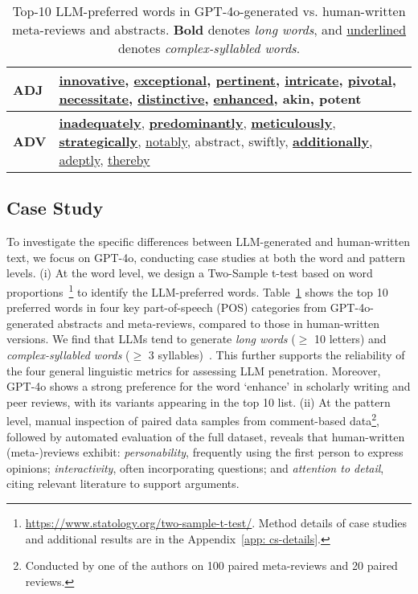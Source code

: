 \begin{table}[t]
{\begin{tabular}{@{}l|p{8cm}}
    \textbf{\small ADJ}  & \small \underline{\textbf{innovative}}, \underline{\textbf{exceptional}}, \underline{pertinent}, \underline{intricate}, \underline{pivotal}, \underline{\textbf{necessitate}}, \underline{\textbf{distinctive}}, \underline{enhanced}, akin, potent
            \\ \midrule
    \textbf{\small ADV}  & \small \underline{\textbf{inadequately}}, \underline{\textbf{predominantly}}, \underline{\textbf{meticulously}}, \underline{\textbf{strategically}}, \underline{notably}, abstract, swiftly, \underline{\textbf{additionally}}, \underline{adeptly}, \underline{thereby}
          \\ 
  \bottomrule
    \end{tabular}
    }
    \caption{Top-10 LLM-preferred words in GPT-4o-generated vs. human-written meta-reviews and abstracts. \textbf{Bold} denotes \textit{long words}, and \underline{underlined} denotes \textit{complex-syllabled words}.}
    \label{tab:word_case}
\end{table}

\subsection{Case Study}
\label{sec: Case Study}
To investigate the specific differences between LLM-generated and human-written text, we focus on GPT-4o, conducting case studies at both the word and pattern levels. 
(i) At the word level, we design a Two-Sample t-test based on word proportions~\cite{cressie1986use, 10.1093/biomet/34.1-2.28}\footnote{\url{https://www.statology.org/two-sample-t-test/}. Method details of case studies and additional results are in the Appendix~\ref{app: cs-details}.} to identify the LLM-preferred words.
Table~\ref{tab:word_case} shows the top 10 preferred words in four key part-of-speech (POS)
categories from GPT-4o-generated abstracts and meta-reviews, compared to those in human-written versions. We find that LLMs tend to generate \textit{long words} ($\geq$ 10 letters) and \textit{complex-syllabled words} ($\geq$ 3 syllables)~\cite{gunning1952technique}. This further supports the reliability of the four general linguistic metrics for assessing LLM penetration.
Moreover, GPT-4o shows a strong preference for the word `enhance' in scholarly writing and peer reviews, with its variants appearing in the top 10 list.
(ii) At the pattern level, manual inspection of paired data samples from comment-based data\footnote{Conducted by one of the authors on 100 paired meta-reviews and 20 paired reviews.}, followed by automated evaluation of the full dataset, reveals that human-written (meta-)reviews exhibit: 
\textit{personability}, frequently using the first person to express opinions; \textit{interactivity}, often incorporating questions; and \textit{attention to detail}, citing relevant literature to support arguments. 


